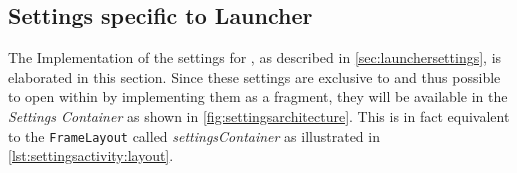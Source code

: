 \subsection{Settings specific to Launcher}
The Implementation of the settings for \launcher, as described in \cref{sec:launchersettings}, is elaborated in this section.
Since these settings are exclusive to \launcher and thus possible to open within \settingsactivity by implementing them as a fragment, they will be available in the \textit{Settings Container} as shown in \cref{fig:settingsarchitecture}.
This is in fact equivalent to the \lstinline|FrameLayout| called \textit{settingsContainer} as illustrated in \cref{lst:settingsactivity:layout}.

